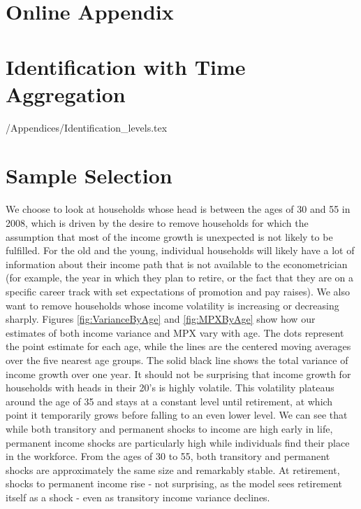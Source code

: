 \documentclass[titlepage]{\econtex}\newcommand{\texname}{ConsumptionHeterogeneity}
\begin{document}
\small

\normalsize

\pagebreak
\appendix
\renewcommand\thefigure{\thesection.\arabic{figure}}  
\renewcommand\thetable{\thesection.\arabic{table}}  

\section*{Online Appendix}

\section{Identification with Time Aggregation}\label{sec:Identification}

\setcounter{figure}{0}   
\setcounter{table}{0} 
\econtexRoot/Appendices/Identification_levels.tex

\section{Sample Selection} \label{sample_selection}
\setcounter{figure}{0}   
\setcounter{table}{0} 
We choose to look at households whose head is between the ages of 30 and 55 in 2008, which is driven by the desire to remove households for which the assumption that most of the income growth is unexpected is not likely to be fulfilled. For the old and the young, individual households will likely have a lot of information about their income path that is not available to the econometrician (for example, the year in which they plan to retire, or the fact that they are on a specific career track with set expectations of promotion and pay raises). We also want to remove households whose income volatility is increasing or decreasing sharply. Figures \ref{fig:VarianceByAge} and \ref{fig:MPXByAge} show how our estimates of both income variance and MPX vary with age. The dots represent the point estimate for each age, while the lines are the centered moving averages over the five nearest age groups. The solid black line shows the total variance of income growth over one year. It should not be surprising that income growth for households with heads in their 20's is highly volatile. This volatility plateaus around the age of 35 and stays at a constant level until retirement, at which point it temporarily grows before falling to an even lower level. We can see that while both transitory and permanent shocks to income are high early in life, permanent income shocks are particularly high while individuals find their place in the workforce. From the ages of 30 to 55, both transitory and permanent shocks are approximately the same size and remarkably stable. At retirement, shocks to permanent income rise - not surprising, as the model sees retirement itself as a shock - even as transitory income variance declines.
\end{document}
